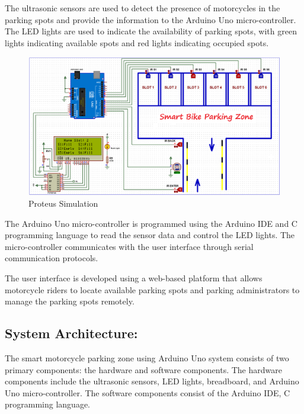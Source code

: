 \documentclass[conference]{IEEEtran}
\begin{document}
The ultrasonic sensors are used to detect the presence of motorcycles in the parking spots and provide the information to the Arduino Uno micro-controller. The LED lights are used to indicate the availability of parking spots, with green lights indicating available spots and red lights indicating occupied spots.
\begin{figure}[htbp]
	\centerline{\includegraphics[scale=0.25]{Proteus Simulation.png}}
	\caption{Proteus Simulation}
	\label{fig}
\end{figure}

The Arduino Uno micro-controller is programmed using the Arduino IDE and C programming language to read the sensor data and control the LED lights. The micro-controller communicates with the user interface through serial communication protocols.

The user interface is developed using a web-based platform that allows motorcycle riders to locate available parking spots and parking administrators to manage the parking spots remotely.
	\subsection{System Architecture:}
	The smart motorcycle parking zone using Arduino Uno system consists of two primary components: the hardware and software components. The hardware components include the ultrasonic sensors, LED lights, breadboard, and Arduino Uno micro-controller. The software components consist of the Arduino IDE, C programming language.\cite{b7}
\end{document}
